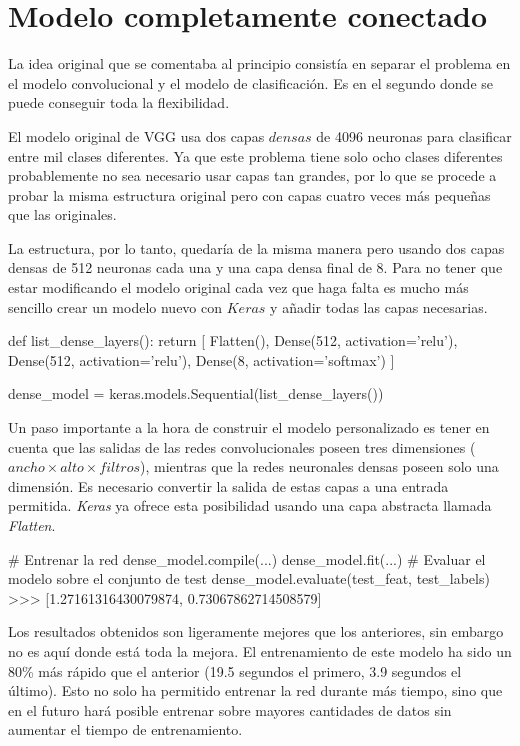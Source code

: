 \section{Modelo completamente conectado}

La idea original que se comentaba al principio consistía en separar el problema en el modelo convolucional y el modelo de clasificación. Es en el segundo donde se puede conseguir toda la flexibilidad.

El modelo original de VGG usa dos capas $densas$ de 4096 neuronas para clasificar entre mil clases diferentes. Ya que este problema tiene solo ocho clases diferentes probablemente no sea necesario usar capas tan grandes, por lo que se procede a probar la misma estructura original pero con capas cuatro veces más pequeñas que las originales.

La estructura, por lo tanto, quedaría de la misma manera pero usando dos capas densas de 512 neuronas cada una y una capa densa final de 8. Para no tener que estar modificando el modelo original cada vez que haga falta es mucho más sencillo crear un modelo nuevo con $Keras$ y añadir todas las capas necesarias.

\begin{python}
def list_dense_layers():
    return [
        Flatten(),
        Dense(512, activation='relu'),
        Dense(512, activation='relu'),
        Dense(8, activation='softmax')
    ]

dense_model = keras.models.Sequential(list_dense_layers())
\end{python}

Un paso importante a la hora de construir el modelo personalizado es tener en cuenta que las salidas de las redes convolucionales poseen tres dimensiones ($ancho \times alto \times filtros$), mientras que la redes neuronales densas poseen solo una dimensión. Es necesario convertir la salida de estas capas a una entrada permitida. \textit{Keras} ya ofrece esta posibilidad usando una capa abstracta llamada \textit{Flatten}.

\begin{python}
# Entrenar la red
dense_model.compile(...)
dense_model.fit(...)
# Evaluar el modelo sobre el conjunto de test
dense_model.evaluate(test_feat, test_labels)
>>> [1.27161316430079874, 0.73067862714508579]
\end{python}

Los resultados obtenidos son ligeramente mejores que los anteriores, sin embargo no es aquí donde está toda la mejora. El entrenamiento de este modelo ha sido un 80\% más rápido que el anterior (19.5 segundos el primero, 3.9 segundos el último). Esto no solo ha permitido entrenar la red durante más tiempo, sino que en el futuro hará posible entrenar sobre mayores cantidades de datos sin aumentar el tiempo de entrenamiento.

